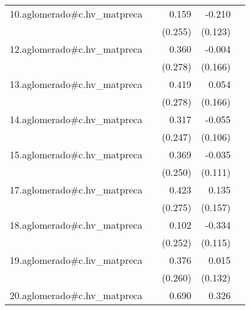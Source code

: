 {\begin{longtable}{l*{4}{D{.}{.}{-1}}}
\addlinespace
10.aglomerado#c.hv\_matpreca&                     &       0.159         &      -0.210         &                     \\
            &                     &     (0.255)         &     (0.123)         &                     \\
\addlinespace
12.aglomerado#c.hv\_matpreca&                     &       0.360         &      -0.004         &                     \\
            &                     &     (0.278)         &     (0.166)         &                     \\
\addlinespace
13.aglomerado#c.hv\_matpreca&                     &       0.419         &       0.054         &                     \\
            &                     &     (0.278)         &     (0.166)         &                     \\
\addlinespace
14.aglomerado#c.hv\_matpreca&                     &       0.317         &      -0.055         &                     \\
            &                     &     (0.247)         &     (0.106)         &                     \\
\addlinespace
15.aglomerado#c.hv\_matpreca&                     &       0.369         &      -0.035         &                     \\
            &                     &     (0.250)         &     (0.111)         &                     \\
\addlinespace
17.aglomerado#c.hv\_matpreca&                     &       0.423         &       0.135         &                     \\
            &                     &     (0.275)         &     (0.157)         &                     \\
\addlinespace
18.aglomerado#c.hv\_matpreca&                     &       0.102         &      -0.334\sym{**} &                     \\
            &                     &     (0.252)         &     (0.115)         &                     \\
\addlinespace
19.aglomerado#c.hv\_matpreca&                     &       0.376         &       0.015         &                     \\
            &                     &     (0.260)         &     (0.132)         &                     \\
\addlinespace
20.aglomerado#c.hv\_matpreca&                     &       0.690         &       0.326         &                     \\

\end{longtable}}
